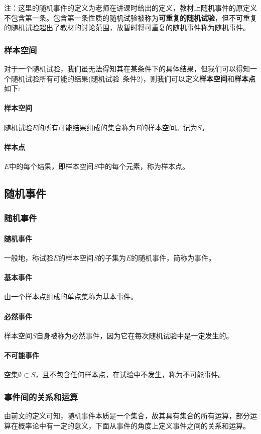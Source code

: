 \documentclass[UTF8]{ctexart}
\begin{document}
		注：这里的随机事件的定义为老师在讲课时给出的定义，教材上随机事件的原定义不包含第一条。包含第一条性质的随机试验被称为\textbf{可重复的随机试验}，但不可重复的随机试验超出了教材的讨论范围，故暂时将可重复的随机事件称为随机事件。
		\subsubsection{样本空间}
		对于一个随机试验，我们虽无法得知其在某条件下的具体结果，但我们可以得知一个随机试验所有可能的结果(随机试验\ 条件2)，则我们可以定义\textbf{样本空间}和\textbf{样本点}如下:
		\paragraph{样本空间} 随机试验$E$的所有可能结果组成的集合称为$E$的样本空间。记为$S$。
		\paragraph{样本点} $E$中的每个结果，即样本空间$S$中的每个元素，称为样本点。
	\subsection{随机事件}
		\subsubsection{随机事件}
		\paragraph{随机事件} 一般地，称试验$E$的样本空间$S$的子集为$E$的随机事件，简称为事件。
		\paragraph{基本事件}由一个样本点组成的单点集称为基本事件。
		\paragraph{必然事件}样本空间$S$自身被称为必然事件，因为它在每次随机试验中是一定发生的。
		\paragraph{不可能事件}空集$\emptyset \subset S$，且不包含任何样本点，在试验中不发生，称为不可能事件。
		\subsubsection{事件间的关系和运算}
		由前文的定义可知，随机事件本质是一个集合，故其具有集合的所有运算，部分运算在概率论中有一定的意义，下面从事件的角度上定义事件之间的关系和运算。
		
\end{document}
